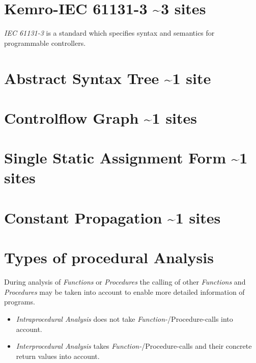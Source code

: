 \section{Kemro-IEC 61131-3 \textasciitilde 3 sites}
\emph{IEC 61131-3} is a standard which specifies syntax and semantics for programmable controllers. 
% 
 
\section{Abstract Syntax Tree \textasciitilde 1 site}
% 
\section{Controlflow Graph \textasciitilde 1 sites}
\section{Single Static Assignment Form \textasciitilde 1 sites}

\section{Constant Propagation \textasciitilde 1 sites}
% 
\section{Types of procedural Analysis}

During analysis of \emph{Functions} or \emph{Procedures} the calling of other \emph{Functions} and \emph{Procedures} may be taken into account to enable more detailed information of programs.


\begin{itemize}
	\item \emph{Intraprocedural Analysis} does not take \emph{Function-}/Procedure-calls into account. 
	\item \emph{Interprocedural Analysis} takes \emph{Function-}/Procedure-calls and their concrete return values into account.
\end{itemize}


